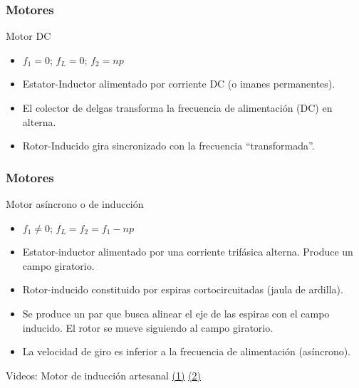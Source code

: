 \documentclass[serif, xcolor=dvipsnames]{beamer}
\begin{document}
\begin{frame}
  \frametitle{Motores}
  \begin{block} {Motor DC}
    \begin{itemize}
    \item $f_{1}=0$; $f_{L}=0$;\textrm{ $f_{2}=np$}
    \item Estator-Inductor alimentado por corriente DC (o imanes
      permanentes).
    \item El colector de delgas transforma la frecuencia de
      alimentación (DC) en alterna.
    \item Rotor-Inducido gira sincronizado con la frecuencia
      {}``transformada''.
    \end{itemize}
  \end{block}

\end{frame}
\begin{frame}
  \frametitle{Motores}
  \begin{block} {Motor asíncrono o de inducción}
    \begin{itemize}
    \item $f_{1}\neq0$; \textrm{$f_{L}=f_{2}=f_{1}-np$}
    \item Estator-inductor alimentado por una corriente trifásica
      alterna. Produce un campo giratorio.
    \item Rotor-inducido constituido por espiras cortocircuitadas
      (jaula de ardilla).
    \item Se produce un par que busca alinear el eje de las espiras
      con el campo inducido. El rotor se mueve siguiendo al campo
      giratorio.
    \item La velocidad de giro es inferior a la frecuencia de
      alimentación (asíncrono).
    \end{itemize}
  \end{block}
  Videos: Motor de inducción artesanal
  \href{http://www.youtube.com/watch?v=ZRGlAu0uCHY&feature=related}{(1)}
  \href{http://www.youtube.com/watch?v=P-eTLmJC2cQ}{(2)}
\end{frame}
\end{document}
